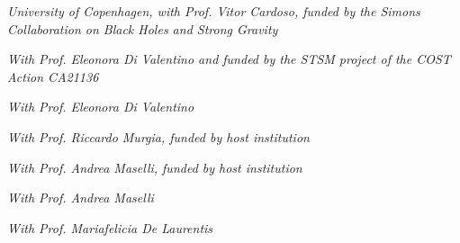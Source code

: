 \resumeSubHeadingListStart
{}
\begin{indentedtext}
\textit{University of Copenhagen, with Prof. Vitor Cardoso, funded by the Simons Collaboration on Black Holes and Strong Gravity}
\end{indentedtext}
\resumeSubHeadingListEnd

\resumeSubHeadingListStart
{}
\begin{indentedtext}
\textit{With Prof. Eleonora Di Valentino and funded by the STSM project of the COST Action CA21136}
\end{indentedtext}
\resumeSubHeadingListEnd

\resumeSubHeadingListStart
{}
\begin{indentedtext}
\textit{With Prof. Eleonora Di Valentino}
\end{indentedtext}
\resumeSubHeadingListEnd

\resumeSubHeadingListStart
{}
\begin{indentedtext}
\textit{With Prof. Riccardo Murgia, funded by host institution}
\end{indentedtext}
\resumeSubHeadingListEnd

\resumeSubHeadingListStart
{}
\begin{indentedtext}
\textit{With Prof. Andrea Maselli, funded by host institution}
\end{indentedtext}
\resumeSubHeadingListEnd

\resumeSubHeadingListStart
{}
\begin{indentedtext}
\textit{With Prof. Andrea Maselli}
\end{indentedtext}
\resumeSubHeadingListEnd

\resumeSubHeadingListStart
{}
\begin{indentedtext}
\textit{With Prof. Mariafelicia De Laurentis}
\end{indentedtext}
\resumeSubHeadingListEnd
